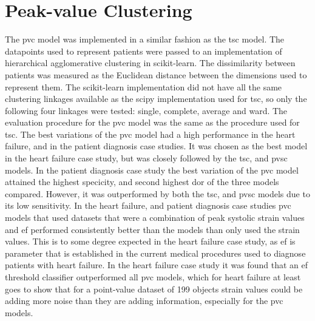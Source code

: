 \section{Peak-value Clustering}
The \acrshort{pvc} model was implemented in a similar fashion as the \acrshort{tsc} model.
The datapoints used to represent patients were passed to an implementation of hierarchical agglomerative clustering in scikit-learn. The dissimilarity between patients was measured as the Euclidean distance between the dimensions used to represent them. The scikit-learn implementation did not have all the same clustering linkages available as the scipy implementation used for \acrshort{tsc}, so only the following four linkages were tested: single, complete, average and ward. The evaluation procedure for the \acrshort{pvc} model was the same as the procedure used for \acrshort{tsc}. \bigskip
The best variations of the \acrshort{pvc} model had a high performance in the heart failure, and in the patient diagnosis case studies. It was chosen as the best model in the heart failure case study, but was closely followed by the \acrshort{tsc}, and \acrshort{pvsc} models. In the patient diagnosis case study the best variation of the \acrshort{pvc} model attained the highest specicity, and second highest \acrshort{dor} of the three models compared. However, it was outperformed by both the \acrshort{tsc}, and \acrshort{pvsc} models due to its low sensitivity. \bigskip
In the heart failure, and patient diagnosis case studies \acrshort{pvc} models that used datasets that were a combination of peak systolic strain values and \acrshort{ef} performed consistently better than the models than only used the strain values. This is to some degree expected in the heart failure case study, as \acrshort{ef} is parameter that is established in the current medical procedures used to diagnose patients with heart failure. In the heart failure case study it was found that an \acrshort{ef} threshold classifier outperformed all \acrshort{pvc} models, which for heart failure at least goes to show that for a point-value dataset of 199 objects strain values could be adding more noise than they are adding information, especially for the \acrshort{pvc} models. \bigskip
